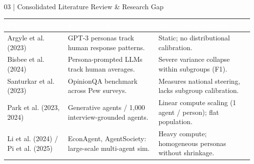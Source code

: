 \documentclass[10pt,aspectratio=169]{beamer}
\begin{document}
\begin{frame}{03 | Consolidated Literature Review \& Research Gap}
    \scriptsize
    \renewcommand{\arraystretch}{1.15}
    \begin{table}
        \centering
        \begin{tabularx}{\textwidth}{@{} >{\raggedright\arraybackslash}p{2.6cm} >{\raggedright\arraybackslash}X >{\raggedright\arraybackslash}X @{}}
            \toprule
            \rowcolor{HeaderNavy}
            \textcolor{white}{\textbf{Paper}} & \textcolor{white}{\textbf{Key Finding}} & \textcolor{white}{\textbf{Identified Limitation}} \\
            \midrule
            \rowcolor{RowAlt} Argyle et al. (2023) & GPT-3 personas track human response patterns. & Static; no distributional calibration. \\
            Bisbee et al. (2024) & Persona-prompted LLMs track human averages. & Severe variance collapse within subgroups (F1). \\
            \rowcolor{RowAlt} Santurkar et al. (2023) & OpinionQA benchmark across Pew surveys. & Measures national steering, lacks subgroup calibration. \\
            Park et al. (2023, 2024) & Generative agents / 1,000 interview-grounded agents. & Linear compute scaling (1 agent / person); flat population. \\
            \rowcolor{RowAlt} Li et al. (2024) / Pi et al. (2025) & EconAgent, AgentSociety: large-scale multi-agent sim. & Heavy compute; homogeneous personas without shrinkage. \\
            \bottomrule
        \end{tabularx}
    \end{table}


\end{frame}
\end{document}
